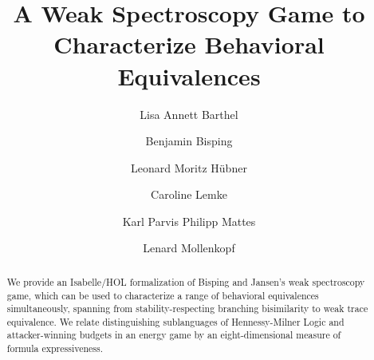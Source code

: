 \documentclass[10pt,a4paper]{article}
\begin{document}
\title{A Weak Spectroscopy Game to Characterize Behavioral Equivalences}
\author{Lisa Annett Barthel \and Benjamin Bisping \and Leonard Moritz Hübner \and Caroline Lemke \and Karl Parvis Philipp Mattes \and Lenard Mollenkopf}
\maketitle

\begin{abstract}
\noindent We provide an Isabelle/HOL formalization of Bisping and Jansen's \cite{bisping2023lineartimebranchingtime} weak spectroscopy game, which can be used to characterize
a range of behavioral equivalences simultaneously, spanning from stability-respecting branching bisimilarity to weak trace equivalence.
We relate distinguishing sublanguages of Hennessy-Milner Logic and attacker-winning budgets in an energy game by an eight-dimensional measure of formula expressiveness.
\end{abstract}

\tableofcontents




















\end{document}
